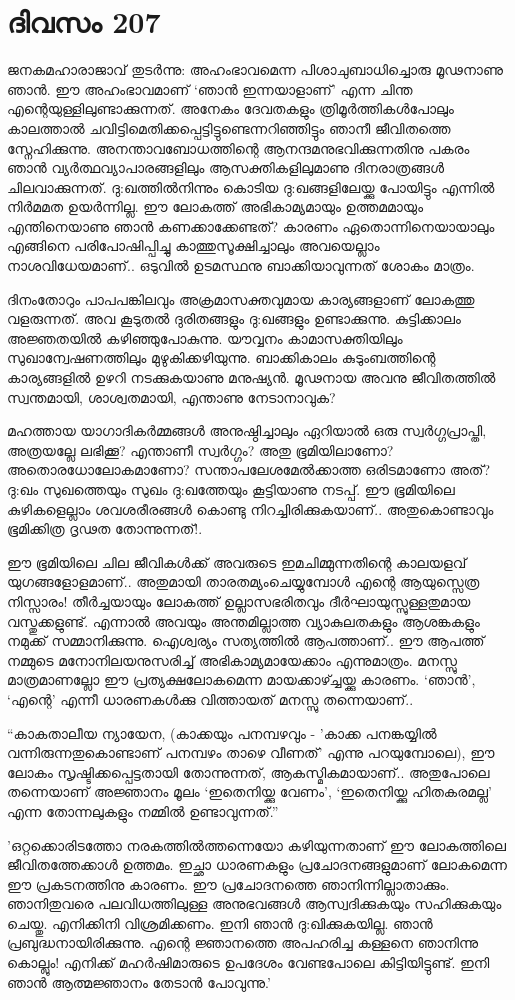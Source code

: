 \section{ദിവസം 207}


ജനകമഹാരാജാവ് തുടർന്നു: അഹംഭാവമെന്ന പിശാചുബാധിച്ചൊരു മൂഢനാണു ഞാൻ. ഈ അഹംഭാവമാണ്‌ ‘ഞാൻ ഇന്നയാളാണ്‌’ എന്ന ചിന്ത എന്റെയുള്ളിലുണ്ടാക്കുന്നത്. അനേകം ദേവതകളും ത്രിമൂർത്തികൾപോലും കാലത്താല്‍  ചവിട്ടിമെതിക്കപ്പെട്ടിട്ടുണ്ടെന്നറിഞ്ഞിട്ടും ഞാനീ ജീവിതത്തെ സ്നേഹിക്കുന്നു. അനന്താവബോധത്തിന്റെ ആനന്ദമനുഭവിക്കുന്നതിനു പകരം ഞാൻ വ്യർത്ഥവ്യാപാരങ്ങളിലും ആസക്തികളിലുമാണു ദിനരാത്രങ്ങൾ ചിലവാക്കുന്നത്. ദു:ഖത്തിൽനിന്നും കൊടിയ ദു:ഖങ്ങളിലേയ്ക്കു പോയിട്ടും എന്നിൽ നിർമമത ഉയർന്നില്ല. ഈ ലോകത്ത് അഭികാമ്യമായും ഉത്തമമായും എന്തിനെയാണു ഞാൻ കണക്കാക്കേണ്ടത്? കാരണം ഏതൊന്നിനെയായാലും എങ്ങിനെ പരിപോഷിപ്പിച്ചു കാത്തുസൂക്ഷിച്ചാലും അവയെല്ലാം  നാശവിധേയമാണ്‌..  ഒടുവിൽ ഉടമസ്ഥനു ബാക്കിയാവുന്നത് ശോകം മാത്രം.

ദിനംതോറും പാപപങ്കിലവും അക്രമാസക്തവുമായ കാര്യങ്ങളാണ് ലോകത്തു വളരുന്നത്. അവ കൂടുതൽ ദുരിതങ്ങളും ദു:ഖങ്ങളും ഉണ്ടാക്കുന്നു. കുട്ടിക്കാലം അജ്ഞതയിൽ കഴിഞ്ഞുപോകുന്നു. യൗവ്വനം കാമാസക്തിയിലും സുഖാന്വേഷണത്തിലും മുഴുകിക്കഴിയുന്നു. ബാക്കികാലം കുടുംബത്തിന്റെ കാര്യങ്ങളിൽ ഉഴറി നടക്കുകയാണു മനുഷ്യൻ. മൂഢനായ അവനു ജീവിതത്തിൽ സ്വന്തമായി, ശാശ്വതമായി, എന്താണു നേടാനാവുക?

മഹത്തായ യാഗാദികർമ്മങ്ങൾ അനുഷ്ഠിച്ചാലും ഏറിയാൽ ഒരു സ്വർഗ്ഗപ്രാപ്തി, അത്രയല്ലേ ലഭിക്കൂ? എന്താണീ സ്വർഗ്ഗം? അതു ഭൂമിയിലാണോ? അതൊരധോലോകമാണോ? സന്താപലേശമേൽക്കാത്ത ഒരിടമാണോ അത്? ദു:ഖം സുഖത്തെയും സുഖം ദു:ഖത്തേയും കൂട്ടിയാണു നടപ്പ്. ഈ ഭൂമിയിലെ കുഴികളെല്ലാം ശവശരീരങ്ങൾ കൊണ്ടു നിറച്ചിരിക്കുകയാണ്‌..  അതുകൊണ്ടാവും ഭൂമിക്കിത്ര ദൃഢത തോന്നുന്നത്!.

ഈ ഭൂമിയിലെ ചില ജീവികൾക്ക് അവരുടെ ഇമചിമ്മുന്നതിന്റെ കാലയളവ് യുഗങ്ങളോളമാണ്‌..  അതുമായി താരതമ്യംചെയ്യുമ്പോൾ എന്റെ ആയുസ്സെത്ര നിസ്സാരം! തീർച്ചയായും ലോകത്ത് ഉല്ലാസഭരിതവും ദീർഘായുസ്സുള്ളതുമായ വസ്തുക്കളുണ്ട്. എന്നാൽ അവയും അന്തമില്ലാത്ത വ്യാകുലതകളും ആശങ്കകളും നമുക്ക് സമ്മാനിക്കുന്നു. ഐശ്വര്യം സത്യത്തിൽ ആപത്താണ്‌..  ഈ ആപത്ത് നമ്മുടെ മനോനിലയനുസരിച്ച് അഭികാമ്യമായേക്കാം എന്നുമാത്രം. മനസ്സു മാത്രമാണല്ലോ ഈ പ്രത്യക്ഷലോകമെന്ന മായക്കാഴ്ച്ചയ്ക്കു കാരണം. ‘ഞാൻ’, ‘എന്റെ’ എന്നീ ധാരണകൾക്കു വിത്തായത് മനസ്സു തന്നെയാണ്‌.. 

“കാകതാലീയ ന്യായേന, (കാക്കയും പനമ്പഴവും - 'കാക്ക പനങ്കയ്യില്‍ വന്നിരുന്നതുകൊണ്ടാണ്‌ പനമ്പഴം താഴെ വീണത്' എന്നു പറയുമ്പോലെ), ഈ ലോകം സൃഷ്ടിക്കപ്പെട്ടതായി തോന്നുന്നത്,  ആകസ്മികമായാണ്‌..  അതുപോലെ തന്നെയാണ്‌ അജ്ഞാനം മൂലം ‘ഇതെനിയ്ക്കു വേണം’, ‘ഇതെനിയ്ക്കു ഹിതകരമല്ല’ എന്ന തോന്നലുകളും നമ്മില്‍ ഉണ്ടാവുന്നത്.”

'ഒറ്റക്കൊരിടത്തോ നരകത്തിൽത്തന്നെയോ കഴിയുന്നതാണ്‌ ഈ ലോകത്തിലെ ജീവിതത്തേക്കാൾ ഉത്തമം. ഇച്ഛാ ധാരണകളും പ്രചോദനങ്ങളുമാണ്‌ ലോകമെന്ന ഈ പ്രകടനത്തിനു കാരണം. ഈ പ്രചോദനത്തെ ഞാനിന്നില്ലാതാക്കും. ഞാനിതുവരെ പലവിധത്തിലുള്ള അനുഭവങ്ങൾ ആസ്വദിക്കുകയും സഹിക്കുകയും ചെയ്തു. എനിക്കിനി വിശ്രമിക്കണം. ഇനി ഞാൻ ദു:ഖിക്കുകയില്ല. ഞാൻ പ്രബുദ്ധനായിരിക്കുന്നു. എന്റെ ജ്ഞാനത്തെ അപഹരിച്ച കള്ളനെ ഞാനിന്നു കൊല്ലും! എനിക്ക് മഹർഷിമാരുടെ ഉപദേശം വേണ്ടപോലെ കിട്ടിയിട്ടുണ്ട്. ഇനി ഞാൻ ആത്മജ്ഞാനം തേടാൻ പോവുന്നു.' 

